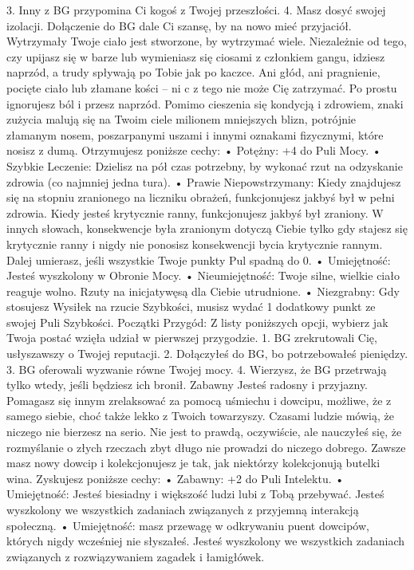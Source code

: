 3. Inny z BG przypomina Ci kogoś z Twojej przeszłości.
4. Masz dosyć swojej izolacji. Dołączenie do BG dale Ci szansę, by na nowo mieć przyjaciół.
Wytrzymały
Twoje ciało jest stworzone, by wytrzymać wiele. Niezależnie od tego, czy upijasz się w barze lub wymieniasz się ciosami z członkiem gangu, idziesz naprzód, a trudy spływają po Tobie jak po kaczce. Ani głód, ani pragnienie, pocięte ciało lub złamane kości – ni c z tego nie może Cię zatrzymać. Po prostu ignorujesz ból i przesz naprzód. 
Pomimo cieszenia się kondycją i zdrowiem, znaki zużycia malują się na Twoim ciele milionem mniejszych blizn, potrójnie złamanym nosem, poszarpanymi uszami i innymi oznakami fizycznymi, które nosisz z dumą.
Otrzymujesz poniższe cechy:
    • Potężny: +4 do Puli Mocy.
    • Szybkie Leczenie: Dzielisz na pół czas potrzebny, by wykonać rzut na odzyskanie zdrowia (co najmniej jedna tura).
    • Prawie Niepowstrzymany: Kiedy znajdujesz się na stopniu zranionego na liczniku obrażeń, funkcjonujesz jakbyś był w pełni zdrowia. Kiedy jesteś krytycznie ranny, funkcjonujesz jakbyś był zraniony. W innych słowach, konsekwencje była zranionym dotyczą Ciebie tylko gdy stajesz się krytycznie ranny i nigdy nie ponosisz konsekwencji bycia krytycznie rannym. Dalej umierasz, jeśli wszystkie Twoje punkty Pul spadną do 0.
    • Umiejętność: Jesteś wyszkolony w Obronie Mocy.
    • Nieumiejętność: Twoje silne, wielkie ciało reaguje wolno. Rzuty na inicjatywęsą dla Ciebie utrudnione.
    • Niezgrabny: Gdy stosujesz Wysiłek na rzucie Szybkości, musisz wydać 1 dodatkowy punkt ze swojej Puli Szybkości.
Początki Przygód: Z listy poniższych opcji, wybierz jak Twoja postać wzięła udział w pierwszej przygodzie.
1. BG zrekrutowali Cię, usłyszawszy o Twojej reputacji.
2. Dołączyłeś do BG, bo potrzebowałeś pieniędzy.
3. BG oferowali wyzwanie równe Twojej mocy.
4. Wierzysz, że BG przetrwają tylko wtedy, jeśli będziesz ich bronił.
Zabawny
Jesteś radosny i przyjazny. Pomagasz się innym zrelaksować za pomocą uśmiechu i dowcipu, możliwe, że z samego siebie, choć także lekko z Twoich towarzyszy.  Czasami ludzie mówią, że niczego nie bierzesz na serio. Nie jest to prawdą, oczywiście, ale nauczyłeś się, że rozmyślanie o złych rzeczach zbyt długo nie prowadzi do niczego dobrego. Zawsze masz nowy dowcip i kolekcjonujesz je tak, jak niektórzy kolekcjonują butelki wina.
Zyskujesz poniższe cechy:
    • Zabawny: +2 do Puli Intelektu.
    • Umiejętność: Jesteś biesiadny i większość ludzi lubi z Tobą przebywać. Jesteś wyszkolony we wszystkich zadaniach związanych z przyjemną interakcją społeczną.
    • Umiejętność: masz przewagę w odkrywaniu puent dowcipów, których nigdy wcześniej nie słyszałeś. Jesteś wyszkolony we wszystkich zadaniach związanych z rozwiązywaniem zagadek i łamigłówek.
